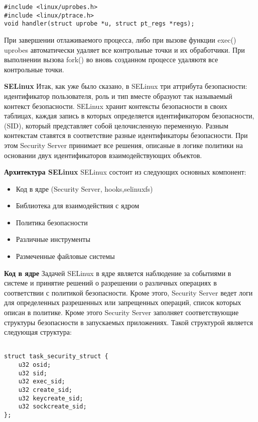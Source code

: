 \begin{lstlisting}
#include <linux/uprobes.h>
#include <linux/ptrace.h>
void handler(struct uprobe *u, struct pt_regs *regs);
\end{lstlisting}

\bigskip
При завершении отлаживаемого процесса, либо при вызове функции exec() uprobes автоматически удаляет все контрольные точки и их обработчики. При выполнении вызова fork() во вновь созданном процессе удаляютя все контрольные точки. 


\bigskip 
{\bfseries SELinux}
Итак, как уже было сказано, в SELinux три аттрибута безопасности: идентификатор пользователя, роль и тип вместе образуют так называемый контекст безопасности. SELinux хранит контексты безопасности в своих таблицах, каждая запись в которых определяется идентификатором безопасности, (SID), который представляет собой целочисленную переменную. Разным контекстам ставятся в соответствие разные идентификаторы безопасности. При этом Security Server принимает все решения, описаные в логике политики на основании двух идентификаторов взаимодействующих объектов. 

\bigskip
{\bfseries Архитектура SELinux}
SELinux состоит из следующих основных компонент:
\begin{itemize}
\item Код в ядре (Security Server, hooks,selinuxfs)
\item Библиотека для взаимодействия с ядром
\item Политика безопасности
\item Различные инструменты
\item Размеченные файловые системы
\end{itemize}

\bigskip
{\bfseries Код в ядре}
Задачей SELinux в ядре является наблюдение за событиями в системе и принятие решений о разрешении о различных операциях в соответствии с политикой безопасности. Кроме этого, Security Server ведет логи для определенных разрешенных или запрещенных операций, список которых описан в политике. Кроме этого Security Server заполняет соответствующие структуры безопасности в запускаемых приложениях. Такой структурой является следующая структура: 

\bigskip 
\begin{lstlisting}
	
struct task_security_struct {
	u32 osid;		
	u32 sid;	
	u32 exec_sid;		
	u32 create_sid;		
	u32 keycreate_sid;	
	u32 sockcreate_sid;	
};

\end{lstlisting}

